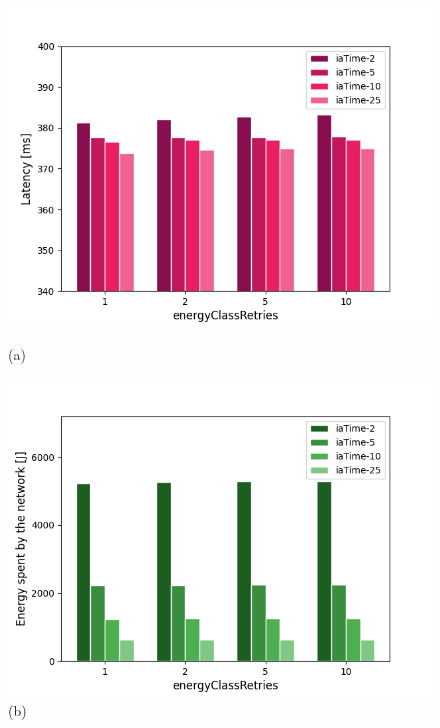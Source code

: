 \documentclass[binding=0.6cm,TFA]{sapthesis}
\begin{document}
\begin{figure}[h]
    \centering
    \begin{minipage}{.5\textwidth}
        \centering
        \includegraphics[width=1\linewidth]{latency_retries__comparison_plot.png}
        \caption*{(a)}
    \end{minipage}%
    \begin{minipage}{.5\textwidth}
        \centering
        \includegraphics[width=1\linewidth]{energy_retries__comparison_plot.png}
        \caption*{(b)}
    \end{minipage}
    \begin{minipage}{.5\textwidth}
        \centering

\end{minipage}
\end{figure}
\end{document}
